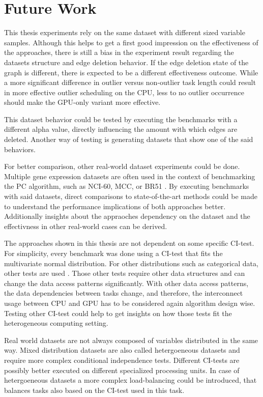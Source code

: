 \chapter{Future Work}
\label{chap:fuwork}
This thesis experiments rely on the same dataset with different sized variable samples. Although this helps to get a first good impression on the effectiveness of the approaches, there is still a bias in the experiment result regarding the datasets structure and edge deletion behavior. If the edge deletion state of the graph is different, there is expected to be a different effectiveness outcome. While a more significant difference in outlier versus non-outlier task length could result in more effective outlier scheduling on the CPU, less to no outlier occurrence should make the GPU-only variant more effective.

This dataset behavior could be tested by executing the benchmarks with a different alpha value, directly influencing the amount with which edges are deleted. Another way of testing is generating datasets that show one of the said behaviors.

For better comparison, other real-world dataset experiments could be done. Multiple gene expression datasets are often used in the context of benchmarking the PC algorithm, such as NCI-60, MCC, or BR51 \cite{leFastPCAlgorithm2019}. By executing benchmarks with said datasets, direct comparisons to state-of-the-art methods could be made to understand the performance implications of both approaches better. Additionally insights about the appraoches dependency on the dataset and the effectivness in other real-world cases can be derived.

The approaches shown in this thesis are not dependent on some specific CI-test. For simplicity, every benchmark was done using a CI-test that fits the multivariate normal distribution. For other distributions such as categorical data, other tests are used \cite{scutariLearningBayesianNetworks2010}. Those other tests require other data structures and can change the data access patterns significantly. With other data access patterns, the data dependencies between tasks change, and therefore, the interconnect usage between CPU and GPU has to be considered again algorithm design wise. Testing other CI-test could help to get insights on how those tests fit the heterogeneous computing setting.

Real world datasets are not always composed of variables distributed in the same way. Mixed distribution datasets are also called hetergoeneous datasets and require more complex conditional independence tests. Different CI-tests are possibly better executed on different specialized processing units. In case of hetergoeneous datasets a more complex load-balancing could be introduced, that balances tasks also based on the CI-test used in this task.

